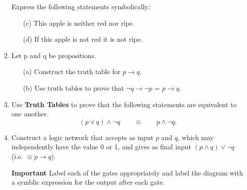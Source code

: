 \documentclass[12pt]{article}
\begin{document}
\begin{enumerate}
 
Express the following statements symbolically:
\begin{itemize}
\item[(c)] This apple is neither red nor ripe.
\item[(d)] If this apple is not red it is not ripe.
\end{itemize}


\item Let p and q be propositions.
\begin{itemize}
\item[(a)]  Construct the truth table for $p \rightarrow q$. 
\item[(b)] Use truth tables to prove that $\neg q \rightarrow \neg p$ = $p \rightarrow q$. 
\end{itemize}

    \item Use \textbf{Truth Tables} to prove that the following statements are equivalent to one another.
\[(p \vee q) \wedge \neg q \qquad \equiv \qquad  p\wedge \neg q.\]
\item 
Construct a logic network that accepts as input $p$ and $q$, which may independently have the value 0 or 1, and
gives as final input $(p \wedge  q) \vee \neg q$ (i.e. $\equiv p \rightarrow q$).



\textbf{Important} Label each of the gates appropriately and label the diagram with a symblic expression for the output after each gate.

\end{enumerate}
\end{document}
